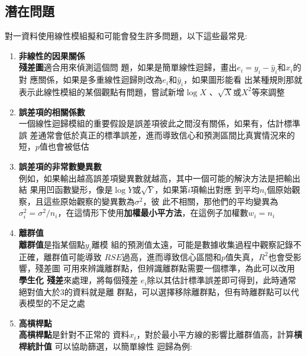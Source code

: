 \documentclass{report} %
\begin{document}
    \subsection{潛在問題}
      對一資料使用線性模組擬和可能會發生許多問題，以下這些最常見:
    \begin{enumerate}
      \item {\bf 非線性的因果關係} \\
        {\bf 殘差圖}適合用來偵測這個問
          題，如果是簡單線性迴歸，畫出$e_i = y_i - \hat{y}_i$和$x_i$的對
          應關係，如果是多重線性迴歸則改為$e_i$和$\hat{y}_i$，如果圖形能看
          出某種規則那就表示此線性模組的某個觀點有問題，嘗試新增$\log{X}$
          、$\sqrt{X}$或$X^2$等來調整
      \item {\bf 誤差項的相關係數} \\
        一個線性迴歸模組的重要假設是誤差項彼此之間沒有關係，如果有，估計標準誤
          差通常會低於真正的標準誤差，進而導致信心和預測區間比真實情況來的
          短，$p$值也會被低估
      \item {\bf 誤差項的非常數變異數} \\
        例如，如果輸出越高誤差項變異數就越高，其中一個可能的解決方法是把輸出結
          果用凹函數變形，像是$\log{Y}$或$\sqrt{Y}$，如果第$i$項輸出對應
          到平均$n_i$個原始觀察，且這些原始觀察的變異數為$\sigma ^ 2$，彼
          此不相關，那他們的平均變異為$\sigma_i ^ 2 = \sigma ^ 2 /
          n_i$，在這情形下使用{\bf 加權最小平方法}，在這例子加權數$w_i = n_i$
      \item {\bf 離群值} \\
        {\bf 離群值}是指某個點$y_i$離模
          組的預測值太遠，可能是數據收集過程中觀察記錄不正確，離群值可能導致
          $RSE$過高，進而導致信心區間和$p$值失真，$R ^ 2$也會受影響，殘差圖
          可用來辨識離群點，但辨識離群點需要一個標準，為此可以改用{\bf 學生化
          殘差}來處理，將每個殘差
          $e_i$除以其估計標準誤差即可得到，此時通常絕對值大於$3$的資料就是離
          群點，可以選擇移除離群點，但有時離群點可以代表模型的不足之處
      \item {\bf 高槓桿點} \\
        {\bf 高槓桿點}是針對不正常的
          資料$x_i$，對於最小平方線的影響比離群值高，計算{\bf 槓桿統計值}
          可以協助篩選，以簡單線性
          迴歸為例:

\end{enumerate}
\end{document}
